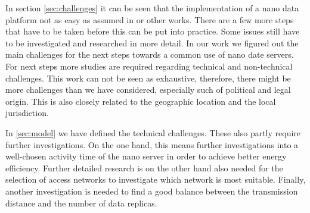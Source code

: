 In section \ref{sec:challenges} it can be seen that the implementation of a nano data platform not as easy as assumed in \cite{Laoutaris:2008:EEC:1341431.1341442} or other works. There are a few more steps that have to be taken before this can be put into practice. Some issues still have to be investigated and researched in more detail. In our work we figured out the main challenges for the next steps towards a common use of nano date servers.
For next steps more studies are required regarding technical and non-technical challenges. This work can not be seen as exhaustive, therefore, there might be more challenges than we have considered, especially such of political and legal origin. This is also closely related to the geographic location and the local jurisdiction.

In \ref{sec:model} we have defined the technical challenges. These also partly require further investigations.
On the one hand, this means further investigations into a well-chosen activity time of the nano server in order to achieve better energy efficiency.
Further detailed research is on the other hand also needed for the selection of access networks to investigate which network is most suitable.
Finally, another investigation is needed to find a good balance between the transmission distance and the number of data replicas.

